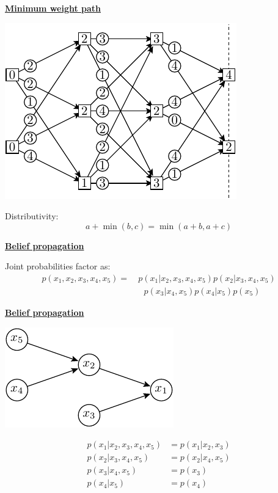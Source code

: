 \documentclass[11pt]{article}
\def\heading #1{\centerline{\underline{\bf\LARGE #1}}}
\def\vsp {\vskip 0.5cm}
\begin{document}
\newpage %

\heading{Minimum weight path}
\centerline{\includegraphics[]{pic-minpath-4.pdf}}

Distributivity:
$$
    a + \min(b, c) = \min(a+b, a+c)
$$


\newpage %

\heading{Belief propagation}

\vsp
Joint probabilities factor as:
\begin{align*}
    p(x_1, x_2, x_3, x_4, x_5) = \ & p(x_1 | x_2, x_3, x_4, x_5)  p(x_2 | x_3, x_4, x_5) \\
        & \ \ \ p(x_3 | x_4, x_5) p( x_4 | x_5) p( x_5) 
\end{align*}

\newpage %

\heading{Belief propagation}

\centerline{\includegraphics[]{pic-belief.pdf}}

\begin{align*}
    p(x_1 | x_2, x_3, x_4, x_5) &= p(x_1 | x_2, x_3) \\
    p(x_2 | x_3, x_4, x_5) &= p(x_2 | x_4, x_5)  \\
    p(x_3 | x_4, x_5)  &= p(x_3) \\
    p(x_4 | x_5) &= p(x_4)
\end{align*}
\end{document}
